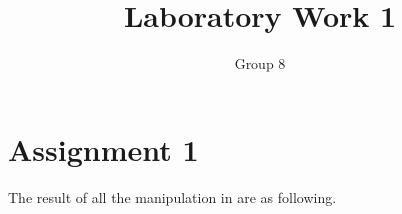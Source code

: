 \documentclass[11pt]{article}
\begin{document}
\author{Group 8}
\title{Laboratory Work 1}
\maketitle

\section{Assignment 1}
The result of all the manipulation in are as following.

\end{document}
